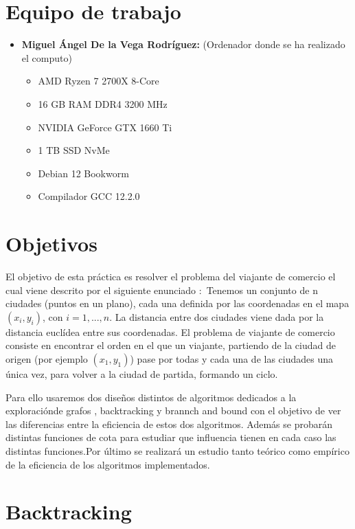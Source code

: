 \documentclass[11pt,openany]{book}
\begin{document}
\chapter{Equipo de trabajo}

\begin{itemize}
      \item \textbf{Miguel Ángel De la Vega Rodríguez:} (Ordenador donde se ha realizado el computo)
            \begin{itemize}
                  \item AMD Ryzen 7 2700X 8-Core
                  \item 16 GB RAM DDR4 3200 MHz
                  \item NVIDIA GeForce GTX 1660 Ti
                  \item 1 TB SSD NvMe
                  \item Debian 12 Bookworm
                  \item Compilador GCC 12.2.0
            \end{itemize}
\end{itemize}

\chapter{Objetivos}
    El objetivo de esta práctica es resolver el problema del viajante de comercio el cual viene descrito por el siguiente enunciado :\
    Tenemos un conjunto de n ciudades (puntos en un plano), cada una definida por las coordenadas en el mapa $(x_i , y_i )$, con $i = 1, . . . , n$. La distancia entre dos ciudades viene dada por la
    distancia euclídea entre sus coordenadas.
    El problema de viajante de comercio consiste en encontrar el orden en el que un viajante,
    partiendo de la ciudad de origen (por ejemplo $(x_1 , y_1 )$) pase por todas y cada una de las ciudades
    una única vez, para volver a la ciudad de partida, formando un ciclo. \ 

    Para ello usaremos dos diseños distintos de  algoritmos dedicados a la exploraciónde grafos , backtracking y brannch and bound 
    con el objetivo de ver las diferencias entre la eficiencia de estos dos algoritmos. Además se probarán distintas funciones de cota 
    para estudiar que influencia tienen en cada caso las distintas funciones.Por último se realizará un estudio tanto teórico como 
    empírico de la eficiencia de los algoritmos implementados.
\chapter{Backtracking}   
\end{document}

